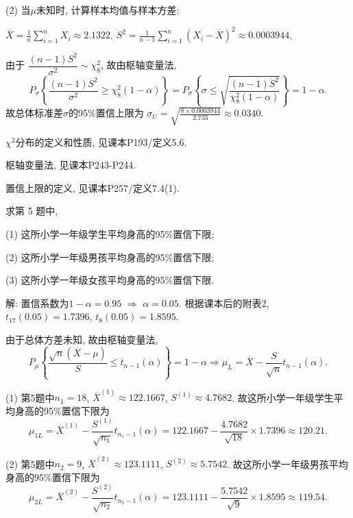 \documentclass[standard]{ExBook}
\renewenvironment{shaded}{%
  \def\FrameCommand{\fboxsep=\FrameSep \colorbox{shadecolor}}%
  \MakeFramed{\advance\hsize-\width \FrameRestore}%
}{%
  \endMakeFramed
}
\begin{document}
\begin{qitems}
(2) 当$\mu$未知时, 计算样本均值与样本方差:

$\overline{X}=\frac{1}{n}\sum_{i=1}^{n}X_i\approx2.1322$. 
$S^2=\frac{1}{n-1}\sum_{i=1}^{n}(X_i-\overline{X})^2\approx0.0003944$.

由于
$
\dfrac{(n-1)S^2}{\sigma^2}\sim\chi_8^2
$,
故由枢轴变量法,
$$
P_{\sigma}\left\{
\frac{(n-1)S^2}{\sigma^2}
\geq\chi_8^2(1-\alpha)
\right\}
=
P_{\sigma}\left\{
\sigma\leq
\sqrt{\frac{(n-1)S^2}{\chi_8^2(1-\alpha)}}
\right\}
=
1-\alpha.
$$
故总体标准差$\sigma$的95\%置信上限为
$
\sigma_U
=
\sqrt{\frac{8\times0.0003944}{2.733}}
\approx0.0340
$.

\textcolor{themeColor}{\selectfont {} $\chi^2$分布的定义和性质, 见课本P193/定义5.6.}

\textcolor{themeColor}{\selectfont {} 枢轴变量法, 见课本P243-P244.}

\textcolor{themeColor}{\selectfont {}
置信上限的定义, 见课本P257/定义7.4(1).}

\vspace{2.5cm-5em}

    \begin{bbox}
    \begin{shaded}
        \qitem
求第 5 题中,

(1) 这所小学一年级学生平均身高的95\%置信下限;

(2) 这所小学一年级男孩平均身高的95\%置信下限;

(3) 这所小学一年级女孩平均身高的95\%置信下限.
    \end{shaded}
    \end{bbox}

\vspace{\dimexpr2.5cm-5em\relax}

解: 置信系数为$1-\alpha=0.95$ $\Longrightarrow$ $\alpha=0.05$. 根据课本后的附表2,
$t_{17}(0.05)=1.7396$, $t_8(0.05)=1.8595$.

由于总体方差未知, 故由枢轴变量法,
$$
P_{\mu}\left\{
\frac{\sqrt{n}(\overline{X}-\mu)}{S}
\leq t_{n-1}(\alpha)
\right\}
=
1-\alpha
\Longrightarrow
\mu_L
=
\overline{X}-\frac{S}{\sqrt{n}}t_{n-1}(\alpha).
$$

(1) 第5题中$n_1=18$, $\overline{X}^{(1)}\approx122.1667$, $S^{(1)}\approx4.7682$. 故这所小学一年级学生平均身高的95\%置信下限为
$$
\mu_{1L}
=
\overline{X}^{(1)}
-\frac{S^{(1)}}{\sqrt{n_1}}t_{n_1-1}(\alpha)
=
122.1667-\frac{4.7682}{\sqrt{18}}\times1.7396
\approx120.21.
$$

(2) 第5题中$n_2=9$, $\overline{X}^{(2)}\approx123.1111$, $S^{(2)}\approx5.7542$. 故这所小学一年级男孩平均身高的95\%置信下限为
$$
\mu_{2L}
=
\overline{X}^{(2)}
-\frac{S^{(2)}}{\sqrt{n_2}}t_{n_2-1}(\alpha)
=
123.1111-\frac{5.7542}{\sqrt{9}}\times1.8595
\approx119.54.
$$


\end{qitems}
\end{document}
